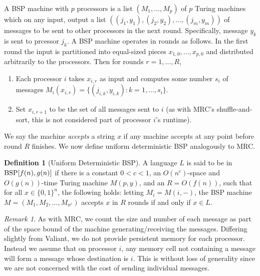 \documentclass[11pt]{article}
\theoremstyle{definition}
\newtheorem{defn}{Definition}
\theoremstyle{remark}
\newtheorem{remark}{Remark}
\newcommand{\bsp}{\textup{BSP}}
\begin{document}
A BSP machine with $p$ processors is a list $(M_1, \dots, M_p)$ of $p$ Turing
machines which on any input, output a list $((j_1, y_1), (j_2, y_2), \dots,
(j_m, y_m))$ of messages to be sent to other processors in the next round.
Specifically, message $y_k$ is sent to prcessor $j_k$. A BSP machine operates
in rounds as follows. In the first round the input is partitioned into
equal-sized pieces $x_{1,0}, \dots, x_{p,0}$ and distributed arbitrarily to the
processors. Then for rounds $r=1, \dots, R$, 

\begin{enumerate}
   \item Each processor $i$ takes $x_{i,r}$ as input and computes some number
$s_i$ of messages $M_i(x_{i,r}) = \{(j_{i,k}, y_{i,k}) : k = 1, \dots, s_i\}$.
   \item Set $x_{i,r+1}$ to be the set of all messages sent to $i$ (as with
MRC's shuffle-and-sort, this is not considered part of processor $i$'s
runtime). 
\end{enumerate} 

We say the machine \emph{accepts} a string $x$ if any machine accepts at any
point before round $R$ finishes. We now define uniform deterministic BSP
analogously to MRC.

\begin{defn}[Uniform Deterministic BSP]

A language $L$ is said to be in $\bsp[f(n),g(n)]$ if there is a constant $0 < c
< 1$, an $O(n^c)$-space and $O(g(n))$-time Turing machine $M(p, y)$, and an $R
= O(f(n))$, such that for all $x \in \{ 0,1 \}^n$, the following holds: letting
$M_i = M(i, -)$, the BSP machine $M = (M_1, M_2, \dots, M_{n^c})$ accepts $x$
in $R$ rounds if and only if $x \in L$.

\end{defn}

\begin{remark}
As with MRC, we count the size and number of each message as part of the space
bound of the machine generating/receiving the messages. Differing slightly from
Valiant, we do not provide persistent memory for each processor. Instead we
assume that on processor $i$, any memory cell not containing a message will
form a message whose destination is $i$. This is without loss of generality
since we are not concerned with the cost of sending individual messages.
\end{remark}
\end{document}
